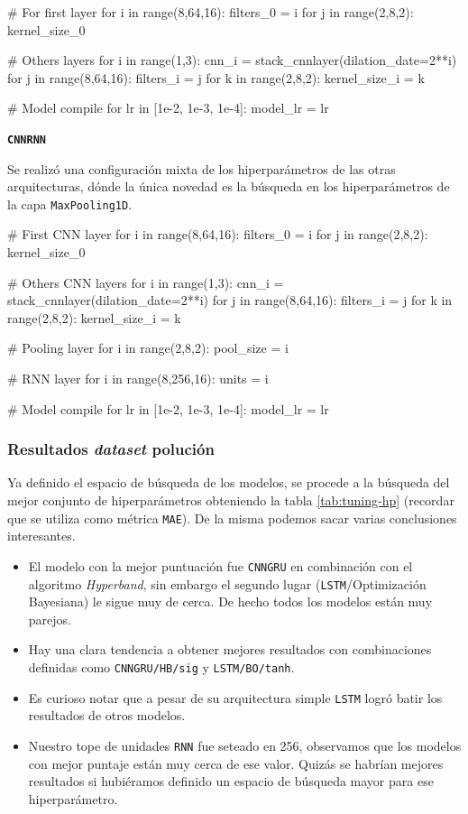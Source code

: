 \documentclass[a4paper,12pt]{article}
\begin{document}
\begin{python}
# For first layer
for i in range(8,64,16):
	filters_0 = i
	for j in range(2,8,2):
		kernel_size_0

# Others layers
for i in range(1,3):
	cnn_i = stack_cnnlayer(dilation_date=2**i)
	for j in range(8,64,16):
		filters_i = j
		for k in range(2,8,2):
			kernel_size_i = k

# Model compile
for lr in [1e-2, 1e-3, 1e-4]:
	model_lr = lr
\end{python}

\textbf{\texttt{CNNRNN}}

Se realizó una configuración mixta de los hiperparámetros de las otras arquitecturas, dónde la única novedad es la búsqueda en los hiperparámetros de la capa \texttt{MaxPooling1D}.

\begin{python}
# First CNN layer
for i in range(8,64,16):
	filters_0 = i
	for j in range(2,8,2):
		kernel_size_0

# Others CNN layers
for i in range(1,3):
	cnn_i = stack_cnnlayer(dilation_date=2**i)
	for j in range(8,64,16):
		filters_i = j
		for k in range(2,8,2):
			kernel_size_i = k
			
# Pooling layer
for i in range(2,8,2):
	pool_size = i
	
# RNN layer
for i in range(8,256,16):
	units = i
	
# Model compile
for lr in [1e-2, 1e-3, 1e-4]:
	model_lr = lr
\end{python}

\subsubsection{Resultados \textit{dataset} polución}

Ya definido el espacio de búsqueda de los modelos, se procede a la búsqueda del mejor conjunto de hiperparámetros obteniendo la tabla \ref{tab:tuning-hp} (recordar que se utiliza como métrica \texttt{MAE}). De la misma podemos sacar varias conclusiones interesantes.
\begin{itemize}
	\item El modelo con la mejor puntuación fue \texttt{CNNGRU} en combinación con el algoritmo \textit{Hyperband}, sin embargo el segundo lugar (\texttt{LSTM}/Optimización Bayesiana) le sigue muy de cerca. De hecho todos los modelos están muy parejos.
	\item Hay una clara tendencia a obtener mejores resultados con combinaciones definidas como \texttt{CNNGRU/HB/sig} y \texttt{LSTM/BO/tanh}.
	\item Es curioso notar que a pesar de su arquitectura simple \texttt{LSTM} logró batir los resultados de otros modelos.
	\item Nuestro tope de unidades \texttt{RNN} fue seteado en 256, observamos que los modelos con mejor puntaje están muy cerca de ese valor. Quizás se habrían mejores resultados si hubiéramos definido un espacio de búsqueda mayor para ese hiperparámetro.
\end{itemize}
\end{document}

